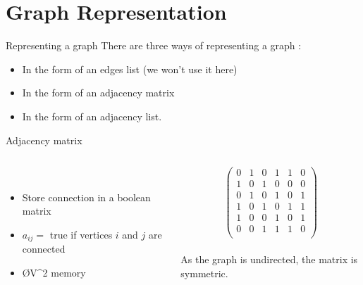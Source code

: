 \documentclass[handout,code={Graphs I},title={Introduction, DFS, BFS}]{../share/cpslide}
\begin{document}
\section{Graph Representation}

\begin{frame}{Representing a graph}
There are three ways of representing a graph : 
\begin{itemize}
\item In the form of an edges list (we won't use it here)
\item In the form of an adjacency matrix
\item In the form of an adjacency list.

\end{itemize}
\end{frame}

\begin{frame}{Adjacency matrix}
\begin{columns}[T] %
\begin{column}[b]{0.6\linewidth}
\begin{minipage}{\linewidth}

\begin{figure}
\begin{adjustbox}{max totalsize={.4\textwidth}{.4\textheight}}
\\
\end{adjustbox}
\end{figure}

\begin{itemize}
\item Store connection in a boolean matrix
\item $a_{ij} =$ true if vertices $i$ and $j$ are connected
\item \O{V^2} memory 
\end{itemize}
\end{minipage}
\end{column}
\begin{column}[b]{0.4\linewidth}
\begin{minipage}{\linewidth}


$$
\begin{pmatrix}
0 & 1 & 0 & 1 & 1 & 0\\ 
1 & 0 & 1 & 0 & 0 & 0\\
0 & 1 & 0 & 1 & 0 & 1\\
1 & 0 & 1 & 0 & 1 & 1\\
1 & 0 & 0 & 1 & 0 & 1\\
0 & 0 & 1 & 1 & 1 & 0\\

\end{pmatrix}
$$\\
As the graph is undirected, the matrix is symmetric.
\end{minipage}
\end{column}
\end{columns}

\end{frame}
\end{document}
